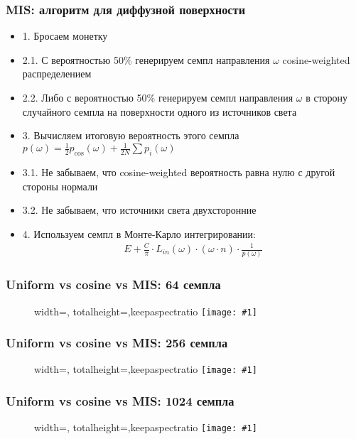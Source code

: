 \documentclass[10pt]{beamer}
\newcommand{\slideimage}[1]{
  \begin{figure}
    \begin{adjustbox}{width=\textwidth, totalheight=\textheight-2\baselineskip-2\baselineskip,keepaspectratio}
      \texttt{[image: \#1]}
    \end{adjustbox}
  \end{figure}
}
\begin{document}
\begin{frame}
\frametitle{MIS: алгоритм для диффузной поверхности}
\begin{itemize}
\item 1. Бросаем монетку
\pause
\item 2.1. С вероятностью 50\% генерируем семпл направления \begin{math}\omega\end{math} cosine-weighted распределением
\pause
\item 2.2. Либо с вероятностью 50\% генерируем семпл направления \begin{math}\omega\end{math} в сторону случайного семпла на поверхности одного из источников света
\pause
\item 3. Вычисляем итоговую вероятность этого семпла \begin{math}p(\omega) = \frac{1}{2}p_{\cos}(\omega) + \frac{1}{2N}\sum p_i(\omega)\end{math}
\pause
\item 3.1. Не забываем, что cosine-weighted вероятность равна нулю с другой стороны нормали
\pause
\item 3.2. Не забываем, что источники света двухсторонние
\pause
\item 4. Используем семпл в Монте-Карло интегрировании:
\begin{gather*}
E + \frac{C}{\pi} \cdot L_{in}(\omega) \cdot (\omega \cdot n) \cdot \frac{1}{p(\omega)}
\end{gather*}
\end{itemize}
\end{frame}

\begin{frame}
\frametitle{Uniform vs cosine vs MIS: 64 семпла}
\slideimage{mis_64.png}
\end{frame}

\begin{frame}
\frametitle{Uniform vs cosine vs MIS: 256 семпла}
\slideimage{mis_256.png}
\end{frame}

\begin{frame}
\frametitle{Uniform vs cosine vs MIS: 1024 семпла}
\slideimage{mis_1024.png}
\end{frame}
\end{document}
